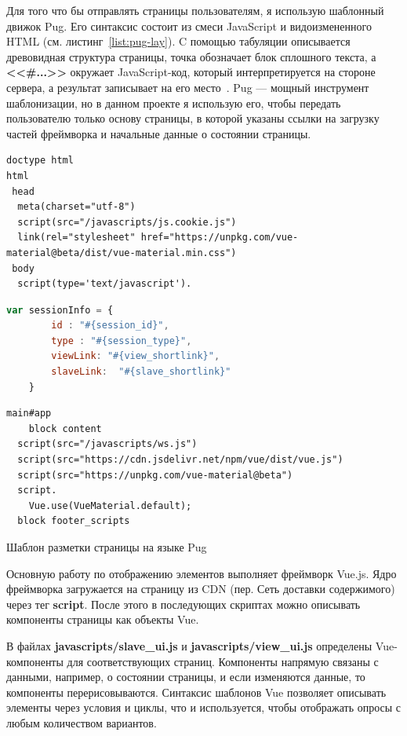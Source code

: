 Для того что бы отправлять страницы пользователям, я использую шаблонный движок Pug. Его синтаксис состоит из смеси JavaScript и видоизмененного HTML (см. листинг~\ref{list:pug-lay}). C помощью табуляции описывается древовидная структура страницы, точка обозначает блок сплошного текста, а \textbf{<<\#{...}>>} окружает JavaScript-код, который интерпретируется на стороне сервера, а результат записывает на его место~\autocite{pug}. Pug --- мощный инструмент шаблонизации, но в данном проекте я использую его, чтобы передать пользователю только основу страницы, в которой указаны ссылки на загрузку частей фреймворка и начальные данные о состоянии страницы.
 \begin{ListingEnv}
	\begin{lstlisting}[language=pug]
doctype html
html
 head
  meta(charset="utf-8")
  script(src="/javascripts/js.cookie.js")
  link(rel="stylesheet" href="https://unpkg.com/vue-material@beta/dist/vue-material.min.css")    
 body
  script(type='text/javascript').
  \end{lstlisting}
  \begin{lstlisting}[language=JavaScript]
     var sessionInfo = {
	 	id : "#{session_id}",
	 	type : "#{session_type}",
		viewLink: "#{view_shortlink}",
		slaveLink:  "#{slave_shortlink}"
	}  
\end{lstlisting}
\begin{lstlisting}[language=pug]
  main#app 
	block content
  script(src="/javascripts/ws.js")
  script(src="https://cdn.jsdelivr.net/npm/vue/dist/vue.js")
  script(src="https://unpkg.com/vue-material@beta")
  script.
	Vue.use(VueMaterial.default);
  block footer_scripts
	\end{lstlisting}
	\caption{Шаблон разметки страницы на языке Pug}
	\label{list:pug-lay}
\end{ListingEnv}      

Основную работу по отображению элементов выполняет фреймворк Vue.js. Ядро фреймворка загружается на страницу из CDN (пер. Сеть доставки содержимого) через тег \textbf{script}. После этого в последующих скриптах можно описывать компоненты страницы как объекты Vue. 

В файлах \textbf{javascripts/slave\_ui.js} и \textbf{javascripts/view\_ui.js} определены Vue-компоненты для соответствующих страниц. Компоненты напрямую связаны с данными, например, о состоянии страницы, и если изменяются данные, то компоненты перерисовываются. Синтаксис шаблонов Vue позволяет описывать элементы через условия и циклы, что и используется, чтобы отображать опросы с любым количеством вариантов.

